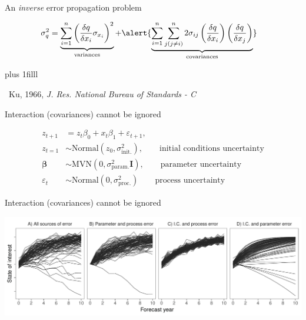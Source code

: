 \documentclass[12pt, compress, aspectratio=1610]{beamer}
\newcommand{\btVFill}{\vskip0pt plus 1filll}
\newcommand{\credit}[1]{\btVFill\par\hfill \footnotesize ~#1}
\begin{document}
\begin{frame}{%
\protect\hypertarget{an-error-propagation-problem-1}{%
An \emph{inverse} error propagation problem}}

\begin{align*}
\sigma^2_q &= \underbrace{\sum^n_{i=1}\left( \frac{\delta q}{\delta x_i} \sigma_{x_i} \right)^2}_{\text{variances}} + \alert{\underbrace{\sum^n_{i=1} \sum^n_{j(j \ne i)} 2 \sigma_{ij}\left( \frac{\delta q}{\delta x_i} \right)\left( \frac{\delta q}{\delta x_j} \right)}_{\text{covariances}}}
\end{align*}

\credit{Ku, 1966, \emph{J. Res. National Bureau of Standards - C}}

\end{frame}

\begin{frame}{%
\protect\hypertarget{interaction-covariances-cannot-be-ignored}{%
Interaction (covariances) cannot be ignored}}

\begin{align*}
z_{t+1} &= z_{t} \beta_0 + x_t \beta_1 + \varepsilon_{t+1}, \\
z_{t=1} &\sim \text{Normal}(z_0, \sigma^2_{\text{init.}}), \qquad \scriptstyle\text{initial conditions uncertainty} \\
\mathbf{\beta} &\sim \text{MVN}(0, \sigma^2_{\text{param.}} \mathbf{I}), \qquad \scriptstyle\text{parameter uncertainty} \\
\varepsilon_t &\sim \text{Normal}(0, \sigma^2_{\text{proc.}}) \qquad \scriptstyle\text{process uncertainty}
\end{align*}

\end{frame}

\begin{frame}{%
\protect\hypertarget{interaction-covariances-cannot-be-ignored-1}{%
Interaction (covariances) cannot be ignored}}

\centering

\includegraphics[width=\textwidth]{./figures/forecast_uncertainty_example.pdf}

\end{frame}
\end{document}
